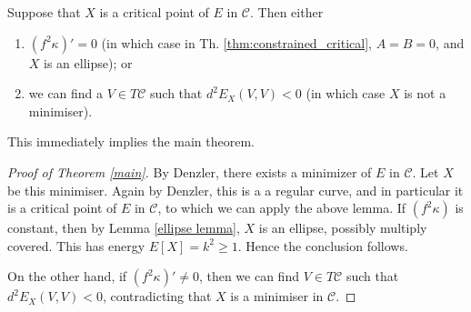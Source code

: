 
\begin{lem} 
\label{dichotomy lemma}
Suppose that $X$ is a critical point of $E$ in $\mathcal{C}$.     Then either 
\begin{enumerate}[label=(\alph*)]
\item $(f^2\kappa)'=0$ (in which case in Th. \ref{thm:constrained_critical}, $A=B=0$, and $X$ is an ellipse);  \label{one} or
\item we can find a $V\in T\mathcal{C}$ such that $d^2E_X(V,V)<0$ (in which case $X$ is not a minimiser).  \label{two}
\end{enumerate}
\end{lem}

This immediately implies the main theorem.

\begin{proof}[Proof of Theorem \ref{main}]  By Denzler, there exists a minimizer of $E$ in $\mathcal{C}$.    Let $X$ be this minimiser.   Again by Denzler, this is a a regular curve, and in particular it is a critical point of $E$ in $\mathcal{C}$, to which we can apply the above lemma.   If $(f^2\kappa)$ is constant, then by Lemma \ref{ellipse lemma}, $X$ is an ellipse, possibly multiply covered.     This has energy $E[X]=k^2\ge 1$.
  Hence the conclusion follows.

On the other hand, if $(f^2\kappa)'\not=0$, then we can find $V\in T\mathcal{C}$ such that $d^2E_X(V,V)<0$, contradicting that $X$ is a minimiser in $\mathcal{C}$.    

\end{proof}

